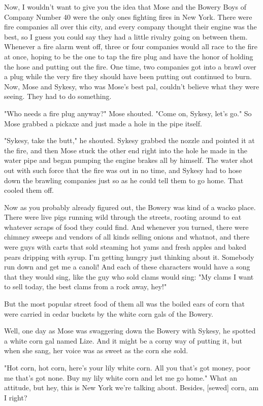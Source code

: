 Now, I wouldn't want to give you the idea that Mose and the Bowery Boys of Company Number 40 were the only ones fighting fires in New York. There were fire companies all over this city, and every company thought their engine was the best, so I guess you could say they had a little rivalry going on between them. Whenever a fire alarm went off, three or four companies would all race to the fire at once, hoping to be the one to tap the fire plug and have the honor of holding the hose and putting out the fire. One time, two companies got into a brawl over a plug while the very fire they should have been putting out continued to burn. Now, Mose and Sykesy, who was Mose's best pal, couldn't believe what they were seeing. They had to do something.

"Who needs a fire plug anyway?" Mose shouted. "Come on, Sykesy, let's go." So Mose grabbed a pickaxe and just made a hole in the pipe itself.

"Sykesy, take the butt," he shouted. Sykesy grabbed the nozzle and pointed it at the fire, and then Mose stuck the other end right into the hole he made in the water pipe and began pumping the engine brakes all by himself. The water shot out with such force that the fire was out in no time, and Sykesy had to hose down the brawling companies just so as he could tell them to go home. That cooled them off.

Now as you probably already figured out, the Bowery was kind of a wacko place. There were live pigs running wild through the streets, rooting around to eat whatever scraps of food they could find. And whenever you turned, there were chimney sweeps and vendors of all kinds selling onions and whatnot, and there were guys with carts that sold steaming hot yams and fresh apples and baked pears dripping with syrup. I'm getting hungry just thinking about it. Somebody run down and get me a canoli! And each of these characters would have a song that they would sing, like the guy who sold clams would sing: "My clams I want to sell today, the best clams from a rock away, hey!"

But the most popular street food of them all was the boiled ears of corn that were carried in cedar buckets by the white corn gals of the Bowery.

Well, one day as Mose was swaggering down the Bowery with Sykesy, he spotted a white corn gal named Lize. And it might be a corny way of putting it, but when she sang, her voice was as sweet as the corn she sold.

"Hot corn, hot corn, here's your lily white corn. All you that's got money, poor me that's got none. Buy my lily white corn and let me go home." What an attitude, but hey, this is New York we're talking about. Besides, [sewed] corn, am I right?

